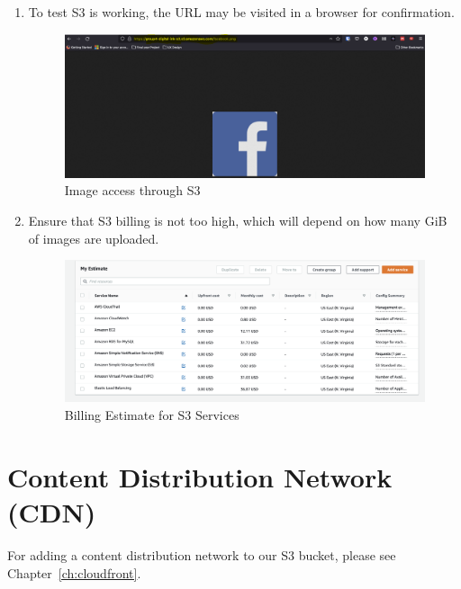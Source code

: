\begin{enumerate}
    \item To test S3 is working, the URL may be visited in a browser for confirmation.
        \begin{figure}[H]
            \centering
            \includegraphics[width=\textwidth]{resources/s3/s3-image-displayed.png}
            \caption{Image access through S3}
            \label{fig:s3-image}
        \end{figure}


    \item Ensure that S3 billing is not too high, which will depend on how many GiB of images are uploaded.
        \begin{figure}[H]
            \centering
            \includegraphics[width=\textwidth]{resources/s3/Screenshot 2022-05-14 at 6.45.18 pm.png}
            \caption{Billing Estimate for S3 Services}
            \label{fig:s3-billing}
        \end{figure}
\end{enumerate}

\section{Content Distribution Network (CDN)}
For adding a content distribution network to our S3 bucket, please see Chapter~\ref{ch:cloudfront}.

